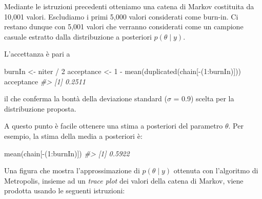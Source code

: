 \documentclass[
  11pt,
]{krantz}
\makeatletter
\newenvironment{Shaded}{\begin{snugshade}}{\end{snugshade}}
\newcommand{\CommentTok}[1]{\textcolor[rgb]{0.37,0.37,0.37}{\textit{#1}}}
\newcommand{\DecValTok}[1]{\textcolor[rgb]{0.06,0.06,0.06}{#1}}
\newcommand{\FunctionTok}[1]{\textcolor[rgb]{0,0,0}{#1}}
\newcommand{\NormalTok}[1]{#1}
\newcommand{\OtherTok}[1]{\textcolor[rgb]{0.37,0.37,0.37}{#1}}
\newcommand{\SpecialCharTok}[1]{\textcolor[rgb]{0,0,0}{#1}}
\newenvironment{kframe}{%
\medskip{}
\setlength{\fboxsep}{.8em}
 \def\at@end@of@kframe{}%
 \ifinner\ifhmode%
  \def\at@end@of@kframe{\end{minipage}}%
  \begin{minipage}{\columnwidth}%
 \fi\fi%
 \def\FrameCommand##1{\hskip\@totalleftmargin \hskip-\fboxsep
 \colorbox{shadecolor}{##1}\hskip-\fboxsep
     \hskip-\linewidth \hskip-\@totalleftmargin \hskip\columnwidth}%
 \MakeFramed {\advance\hsize-\width
   \@totalleftmargin\z@ \linewidth\hsize
   \@setminipage}}%
 {\par\unskip\endMakeFramed%
 \at@end@of@kframe}
\renewenvironment{Shaded}{\begin{kframe}}{\end{kframe}}
\theoremstyle{definition}
\theoremstyle{definition}
\theoremstyle{definition}
\theoremstyle{definition}
\theoremstyle{remark}
\makeatother
\begin{document}
Mediante le istruzioni precedenti otteniamo una catena di Markov costituita da 10,001 valori. Escludiamo i primi 5,000 valori considerati come burn-in. Ci restano dunque con 5,001 valori che verranno considerati come un campione casuale estratto dalla distribuzione a posteriori \(p(\theta \mid y)\).

L'accettanza è pari a

\begin{Shaded}
\begin{Highlighting}[]
\NormalTok{burnIn }\OtherTok{\textless{}{-}}\NormalTok{ niter }\SpecialCharTok{/} \DecValTok{2}
\NormalTok{acceptance }\OtherTok{\textless{}{-}} \DecValTok{1} \SpecialCharTok{{-}} \FunctionTok{mean}\NormalTok{(}\FunctionTok{duplicated}\NormalTok{(chain[}\SpecialCharTok{{-}}\NormalTok{(}\DecValTok{1}\SpecialCharTok{:}\NormalTok{burnIn)]))}
\NormalTok{acceptance}
\CommentTok{\#\textgreater{} [1] 0.2511}
\end{Highlighting}
\end{Shaded}

\noindent il che conferma la bontà della deviazione standard (\(\sigma\) = 0.9) scelta per la distribuzione proposta.

A questo punto è facile ottenere una stima a posteriori del parametro \(\theta\). Per esempio, la stima della media a posteriori è:

\begin{Shaded}
\begin{Highlighting}[]
\FunctionTok{mean}\NormalTok{(chain[}\SpecialCharTok{{-}}\NormalTok{(}\DecValTok{1}\SpecialCharTok{:}\NormalTok{burnIn)])}
\CommentTok{\#\textgreater{} [1] 0.5922}
\end{Highlighting}
\end{Shaded}

Una figura che mostra l'approssimazione di \(p(\theta \mid y)\) ottenuta con l'algoritmo di Metropolis, insieme ad un \emph{trace plot} dei valori della catena di Markov, viene prodotta usando le seguenti istruzioni:
\end{document}
